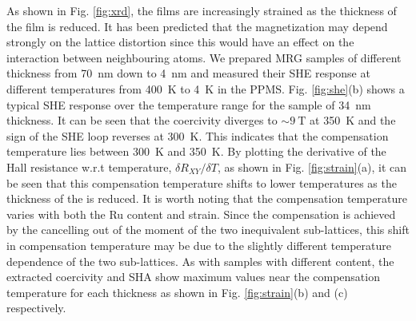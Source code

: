 \documentclass[reprint,aip,apl,floatfix,linenumbers,superscriptaddress]{revtex4-1}
\begin{document}
As shown in Fig. \ref{fig:xrd}, the  films are increasingly strained 
as the thickness of the film is reduced. It has been predicted that the 
magnetization may depend strongly on the lattice distortion since this would 
have an effect on the interaction between neighbouring  atoms. We prepared \ce
{MRG} samples of different thickness from \SI{70}{\nano\metre} down to \SI{4}{
\nano\metre} and measured their SHE response at different temperatures from 
\SI{400}{\kelvin} to \SI{4}{\kelvin} in the PPMS. Fig. \ref{fig:she}(b) shows 
a typical SHE response over the temperature range for the sample of \SI{34}{
\nano\metre} thickness. It can be seen that the coercivity diverges to $
\sim\SI{9}{\tesla}$ at \SI{350}{\kelvin} and the sign of the SHE loop 
reverses at \SI{300}{\kelvin}. This indicates that the compensation 
temperature lies between \SI{300}{\kelvin} and \SI{350}{\kelvin}.  By 
plotting the derivative of the Hall resistance w.r.t temperature, $\delta R_{
XY}/\delta T$, as shown in Fig. \ref{fig:strain}(a), it can be seen that this 
compensation temperature shifts to lower temperatures as the thickness of the 
 is reduced. It is worth noting that the compensation temperature 
varies with both the Ru content and strain. Since the compensation is 
achieved by the cancelling out of the moment of the two inequivalent  
sub-lattices, this shift in compensation temperature may be due to the 
slightly different temperature dependence of the two sub-lattices. As with 
samples with different  content, the extracted coercivity and SHA show 
maximum values near the compensation temperature for each thickness as shown 
in Fig. \ref{fig:strain}(b) and (c) respectively.
\end{document}
